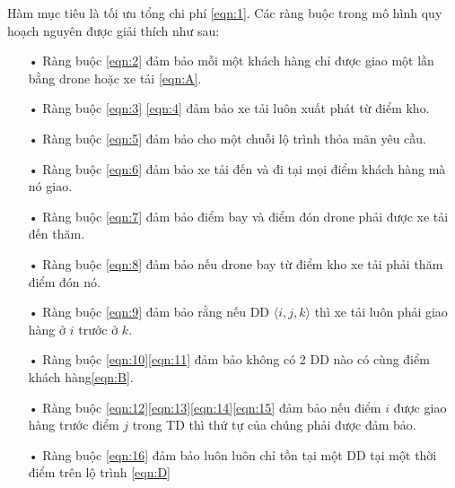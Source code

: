 \documentclass[a4paper,12pt]{report}
\begin{document}
Hàm mục tiêu là tối ưu tổng chi phí \eqref{eqn:1}.
Các ràng buộc trong mô hình quy hoạch nguyên được giải thích như sau:
\begin{itemize}
\item[•] Ràng buộc \eqref{eqn:2} đảm bảo mỗi một khách hàng chỉ được giao một lần bằng drone hoặc xe tải \eqref{eqn:A}.
\item[•] Ràng buộc \eqref{eqn:3} \eqref{eqn:4} đảm bảo xe tải luôn xuất phát từ điểm kho.
\item[•] Ràng buộc \eqref{eqn:5} đảm bảo cho một chuỗi lộ trình thỏa mãn yêu cầu.
\item[•] Ràng buộc \eqref{eqn:6} đảm bảo xe tải đến và đi tại mọi điểm khách hàng mà nó giao.
\item[•] Ràng buộc \eqref{eqn:7} đảm bảo điểm bay và điểm đón drone phải được xe tải đến thăm.
\item[•] Ràng buộc \eqref{eqn:8} đảm bảo nếu drone bay từ điểm kho xe tải phải thăm điểm đón nó.
\item[•] Ràng buộc \eqref{eqn:9} đảm bảo rằng nếu \ac{DD} $\langle i,j,k \rangle $ thì xe tải luôn phải giao hàng ở $i$ trước ở $k$.
\item[•] Ràng buộc \eqref{eqn:10}\eqref{eqn:11} đảm bảo không có 2 \ac{DD} nào có cùng điểm khách hàng\eqref{eqn:B}.
\item[•] Ràng buộc \eqref{eqn:12}\eqref{eqn:13}\eqref{eqn:14}\eqref{eqn:15} đảm bảo nếu điểm $i$ được giao hàng trước điểm $j$ trong \ac{TD} thì thứ tự của chúng phải được đảm bảo.
\item[•] Ràng buộc \eqref{eqn:16} đảm bảo luôn luôn chỉ tồn tại một DD tại một thời điểm trên lộ trình \eqref{eqn:D}
\end{itemize}
\end{document}
